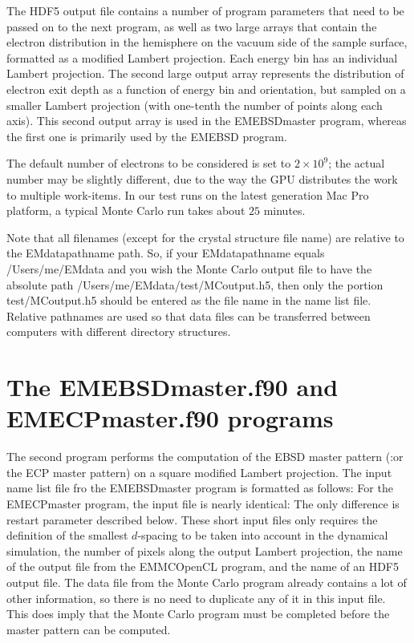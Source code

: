 \documentclass[DIV=calc, paper=letter, fontsize=11pt]{scrartcl}	 %
\begin{document}
The HDF5 output file contains a number of program parameters
that need to be passed on to the next program, as well as two large arrays that contain the electron distribution in the hemisphere on
the vacuum side of the sample surface, formatted as a modified Lambert projection.  Each energy bin has an individual Lambert 
projection.  The second large output array represents the distribution of electron exit depth as a function of energy bin and
orientation, but sampled on a smaller Lambert projection (with one-tenth the number of points along each axis).  This second output
array is used in the \textsf{EMEBSDmaster} program, whereas the first one is primarily used by the \textsf{EMEBSD} program.

The default number of electrons to be considered is set to $2\times 10^9$; the actual number may be slightly different, due 
to the way the GPU distributes the work to multiple work-items.  In our test runs on the latest generation Mac Pro platform, 
a typical Monte Carlo run takes about $25$ minutes.

Note that all filenames (except for the crystal structure file name) are relative to the \textsf{EMdatapathname} path.  So, if your 
\textsf{EMdatapathname} equals \textsf{/Users/me/EMdata} and you wish the Monte Carlo output file to have the absolute path
\textsf{/Users/me/EMdata/test/MCoutput.h5}, then only the portion \textsf{test/MCoutput.h5} should be entered as the file name
in the name list file.  Relative pathnames are used so that data files can be transferred between computers with different directory
structures.

\section{The \protect\textsf{EMEBSDmaster.f90} and \protect\textsf{EMECPmaster.f90} programs\label{sec:f90EBSDmaster}}
The second program performs the computation of the EBSD master pattern (:or the ECP master pattern) on a
square modified Lambert projection. The input name list file fro the \textsf{EMEBSDmaster} program is formatted as follows:
For the \textsf{EMECPmaster} program, the input file is nearly identical:
The only difference is \textsf{restart} parameter described below.
These short input files only requires the definition of the smallest $d$-spacing to be taken into account 
in the dynamical simulation, the number of pixels along the output Lambert projection, the name of the 
output file from the \textsf{EMMCOpenCL} program, and the name of an HDF5 output file.  The data file from
the Monte Carlo program already contains a lot of other information, so there is no need to duplicate 
any of it in this input file.  This does imply that the Monte Carlo program must be completed before the 
master pattern can be computed.
\end{document}
